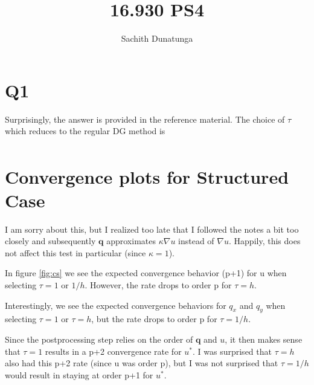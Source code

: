 \documentclass{article}
\begin{document}
\author{Sachith Dunatunga}
\title{16.930 PS4}
\maketitle

\section{Q1}
Surprisingly, the answer is provided in the reference material\cite{nguyen}.
The choice of $\tau$ which reduces to the regular DG method is
\begin{align}
\end{align}

\section{Convergence plots for Structured Case}
I am sorry about this, but I realized too late that I followed the notes a bit too closely and subsequently $\mathbf{q}$ approximates $\kappa \nabla u$ instead of $\nabla u$.
Happily, this does not affect this test in particular (since $\kappa = 1$).

In figure \ref{fig:cs} we see the expected convergence behavior (p+1) for u when selecting $\tau = 1$ or $1/h$.
However, the rate drops to order p for $\tau = h$.

Interestingly, we see the expected convergence behaviors for $q_x$ and $q_y$ when selecting $\tau = 1$ or $\tau = h$, but the rate drops to order p for $\tau = 1/h$.

Since the postprocessing step relies on the order of $\mathbf{q}$ and $u$, it then makes sense that $\tau = 1$ results in a p+2 convergence rate for $u^*$. I was surprised that $\tau = h$ also had this p+2 rate (since u was order p), but I was not surprised that $\tau = 1/h$ would result in staying at order p+1 for $u^*$.
\end{document}

